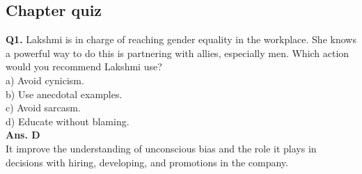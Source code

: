 \documentclass[12pt]{article}
\begin{document}
\subsection{Chapter quiz}
\textbf{Q1.}  Lakshmi is in charge of reaching gender equality in the workplace. She knows a powerful way to do this is partnering with allies, especially men. Which action would you recommend Lakshmi use?\\
a)  Avoid cynicism.\\
b)  Use anecdotal examples.\\
c)  Avoid sarcasm. \\
d)  Educate without blaming.\\
\textbf{Ans. D} \\
It improve the understanding of unconscious bias and the role it plays in decisions with hiring, developing, and promotions in the company.\\
\end{document}
